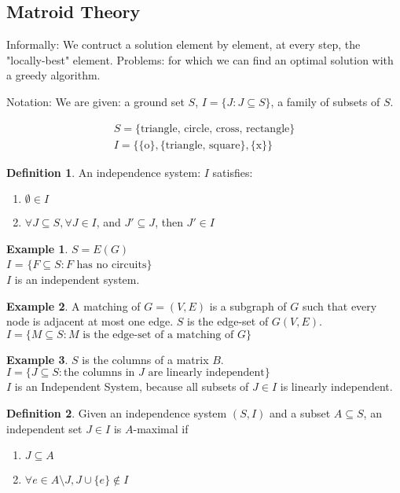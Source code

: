 \documentclass{article}
\theoremstyle{plain}
\theoremstyle{definition}
\newtheorem{eg}{Example}
\newtheorem{defn}{Definition}
\begin{document}
\subsection{Matroid Theory}

Informally: We contruct a solution element by element, at every step, the "locally-best" element.
Problems: for which we can find an optimal solution with a greedy algorithm.

Notation: We are given: a ground set $S$, $I = \{J: J\subseteq S\}$,
a family of subsets of $S$.

\begin{align*}
    S = \{\text{triangle, circle, cross, rectangle}\}\\
    I = \{\{\text{o}\}, \{\text{triangle, square}\}, \{\text{x}\} \}
\end{align*}

\begin{defn}
    An independence system: $I$ satisfies:
    \begin{enumerate}
        \item $\emptyset \in I$
        \item $\forall J\subseteq S, \forall J\in I$, and $J'\subseteq J$, then $J'\in I$
    \end{enumerate}
\end{defn}


\begin{eg}
    $S = E(G)$\\
    $I$ = $\{F\subseteq S: F \text{ has no circuits}\}$\\
    $I$ is an independent system.
\end{eg}

\begin{eg}
    A matching of $G = (V, E)$ is a subgraph of $G$ such that every node is adjacent at
    most one edge.
    $S$ is the edge-set of $G(V, E)$. $I = \{M\subseteq S: M \text{ is the edge-set
    of a matching of $G$}\}$
\end{eg}

\begin{eg}
    $S$ is the columns of a matrix $B$.\\
    $I = \{J\subseteq S: \text{the columns in $J$ are linearly independent}\}$\\
    $I$ is an Independent System, because all subsets of $J\in I$ is linearly
    independent.
\end{eg}

\begin{defn}
    Given an independence system $(S, I)$ and a subset $A\subseteq S$, an
    independent set $J\in I$ is $A$-maximal if
    \begin{enumerate}
        \item $J\subseteq A$
        \item $\forall e\in A\setminus J, J\cup \{e\}\not\in I$
    \end{enumerate}
\end{defn}
\end{document}
